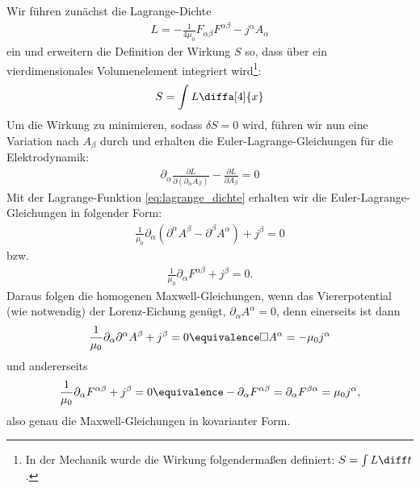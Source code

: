 Wir führen zunächst die Lagrange-Dichte
\begin{align}
    \label{eq:lagrange_dichte}
    L=-\frac{1}{4\mu_0}F_{\alpha\beta} F^{\alpha\beta}-j^\alpha A_\alpha
\end{align}
ein und erweitern die Definition der Wirkung $S$ so, dass über ein vierdimensionales Volumenelement integriert wird\footnote{In der Mechanik wurde die Wirkung folgendermaßen definiert: $S=\int L\diff t$.}:
\begin{align*}
    S=\int L \diffa[4]{x}
\end{align*}
Um die Wirkung zu minimieren, sodass $\delta S=0$ wird, führen wir nun eine Variation nach $A_\beta$ durch und erhalten
die Euler-Lagrange-Gleichungen für die Elektrodynamik:
\begin{align*}
    \boxed{\partial_\alpha \frac{\partial L}{\partial(\partial_\alpha A_\beta)}-\frac{\partial L}{\partial A_\beta}=0}
\end{align*}
Mit der Lagrange-Funktion \eqref{eq:lagrange_dichte} erhalten wir die Euler-Lagrange-Gleichungen in folgender Form:
\begin{align*}
    \boxed{\frac{1}{\mu_0}\partial_\alpha\left(\partial^\alpha A^\beta-\partial^\beta A^\alpha\right) + j^\beta=0}
\end{align*}
bzw.
\begin{align*}
    \boxed{\frac{1}{\mu_0}\partial_\alpha F^{\alpha\beta} + j^\beta=0.}
\end{align*}
Daraus folgen die homogenen Maxwell-Gleichungen, wenn das Viererpotential (wie notwendig) der Lorenz-Eichung genügt, $\partial_\alpha A^\alpha=0$, denn einerseits ist dann
\begin{align*}
    \frac{1}{\mu_0}\partial_\alpha\partial^\alpha A^\beta + j^\beta=0 \equivalence \Box A^\alpha=-\mu_0 j^\alpha
\end{align*}
und andererseits
\begin{align*}
    \frac{1}{\mu_0}\partial_\alpha F^{\alpha\beta} + j^\beta = 0 \equivalence -\partial_\alpha F^{\alpha\beta} = \partial_\alpha F^{\beta\alpha}=\mu_0 j^\alpha ,
\end{align*}
also genau die Maxwell-Gleichungen in kovarianter Form.



